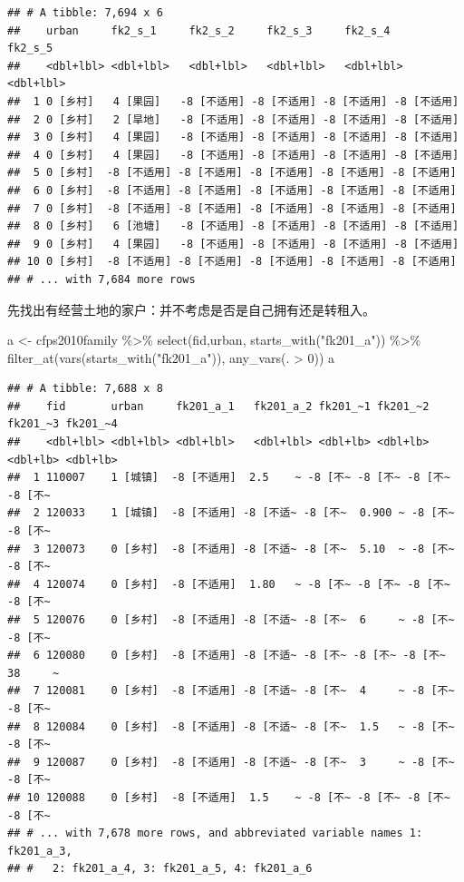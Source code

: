\documentclass[
  oneside]{book}
\newenvironment{Shaded}{\begin{snugshade}}{\end{snugshade}}
\newcommand{\DecValTok}[1]{\textcolor[rgb]{0.00,0.00,0.81}{#1}}
\newcommand{\FunctionTok}[1]{\textcolor[rgb]{0.00,0.00,0.00}{#1}}
\newcommand{\NormalTok}[1]{#1}
\newcommand{\OtherTok}[1]{\textcolor[rgb]{0.56,0.35,0.01}{#1}}
\newcommand{\SpecialCharTok}[1]{\textcolor[rgb]{0.00,0.00,0.00}{#1}}
\newcommand{\StringTok}[1]{\textcolor[rgb]{0.31,0.60,0.02}{#1}}
\begin{document}
\begin{verbatim}
## # A tibble: 7,694 x 6
##    urban     fk2_s_1     fk2_s_2     fk2_s_3     fk2_s_4     fk2_s_5    
##    <dbl+lbl> <dbl+lbl>   <dbl+lbl>   <dbl+lbl>   <dbl+lbl>   <dbl+lbl>  
##  1 0 [乡村]   4 [果园]   -8 [不适用] -8 [不适用] -8 [不适用] -8 [不适用]
##  2 0 [乡村]   2 [旱地]   -8 [不适用] -8 [不适用] -8 [不适用] -8 [不适用]
##  3 0 [乡村]   4 [果园]   -8 [不适用] -8 [不适用] -8 [不适用] -8 [不适用]
##  4 0 [乡村]   4 [果园]   -8 [不适用] -8 [不适用] -8 [不适用] -8 [不适用]
##  5 0 [乡村]  -8 [不适用] -8 [不适用] -8 [不适用] -8 [不适用] -8 [不适用]
##  6 0 [乡村]  -8 [不适用] -8 [不适用] -8 [不适用] -8 [不适用] -8 [不适用]
##  7 0 [乡村]  -8 [不适用] -8 [不适用] -8 [不适用] -8 [不适用] -8 [不适用]
##  8 0 [乡村]   6 [池塘]   -8 [不适用] -8 [不适用] -8 [不适用] -8 [不适用]
##  9 0 [乡村]   4 [果园]   -8 [不适用] -8 [不适用] -8 [不适用] -8 [不适用]
## 10 0 [乡村]  -8 [不适用] -8 [不适用] -8 [不适用] -8 [不适用] -8 [不适用]
## # ... with 7,684 more rows
\end{verbatim}

先找出有经营土地的家户：并不考虑是否是自己拥有还是转租入。

\begin{Shaded}
\begin{Highlighting}[]
\NormalTok{a }\OtherTok{\textless{}{-}}\NormalTok{ cfps2010family }\SpecialCharTok{\%\textgreater{}\%}
  \FunctionTok{select}\NormalTok{(fid,urban, }\FunctionTok{starts\_with}\NormalTok{(}\StringTok{"fk201\_a"}\NormalTok{)) }\SpecialCharTok{\%\textgreater{}\%}
  \FunctionTok{filter\_at}\NormalTok{(}\FunctionTok{vars}\NormalTok{(}\FunctionTok{starts\_with}\NormalTok{(}\StringTok{"fk201\_a"}\NormalTok{)), }\FunctionTok{any\_vars}\NormalTok{(. }\SpecialCharTok{\textgreater{}} \DecValTok{0}\NormalTok{))}
\NormalTok{a}
\end{Highlighting}
\end{Shaded}

\begin{verbatim}
## # A tibble: 7,688 x 8
##    fid       urban     fk201_a_1   fk201_a_2 fk201_~1 fk201_~2 fk201_~3 fk201_~4
##    <dbl+lbl> <dbl+lbl> <dbl+lbl>   <dbl+lbl> <dbl+lb> <dbl+lb> <dbl+lb> <dbl+lb>
##  1 110007    1 [城镇]  -8 [不适用]  2.5    ~ -8 [不~ -8 [不~ -8 [不~ -8 [不~
##  2 120033    1 [城镇]  -8 [不适用] -8 [不适~ -8 [不~  0.900 ~ -8 [不~ -8 [不~
##  3 120073    0 [乡村]  -8 [不适用] -8 [不适~ -8 [不~  5.10  ~ -8 [不~ -8 [不~
##  4 120074    0 [乡村]  -8 [不适用]  1.80   ~ -8 [不~ -8 [不~ -8 [不~ -8 [不~
##  5 120076    0 [乡村]  -8 [不适用] -8 [不适~ -8 [不~  6     ~ -8 [不~ -8 [不~
##  6 120080    0 [乡村]  -8 [不适用] -8 [不适~ -8 [不~ -8 [不~ -8 [不~ 38     ~
##  7 120081    0 [乡村]  -8 [不适用] -8 [不适~ -8 [不~  4     ~ -8 [不~ -8 [不~
##  8 120084    0 [乡村]  -8 [不适用] -8 [不适~ -8 [不~  1.5   ~ -8 [不~ -8 [不~
##  9 120087    0 [乡村]  -8 [不适用] -8 [不适~ -8 [不~  3     ~ -8 [不~ -8 [不~
## 10 120088    0 [乡村]  -8 [不适用]  1.5    ~ -8 [不~ -8 [不~ -8 [不~ -8 [不~
## # ... with 7,678 more rows, and abbreviated variable names 1: fk201_a_3,
## #   2: fk201_a_4, 3: fk201_a_5, 4: fk201_a_6
\end{verbatim}
\end{document}
